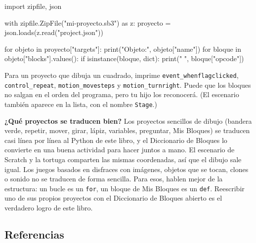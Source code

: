 \begin{code}
import zipfile, json

with zipfile.ZipFile("mi-proyecto.sb3") as z:
    proyecto = json.loads(z.read("project.json"))

for objeto in proyecto["targets"]:
    print("Objeto:", objeto["name"])
    for bloque in objeto["blocks"].values():
        if isinstance(bloque, dict):
            print("   ", bloque["opcode"])
\end{code}

Para un proyecto que dibuja un cuadrado, imprime \texttt{event\_whenflagclicked}, \texttt{control\_repeat}, \texttt{motion\_movesteps} y \texttt{motion\_turnright}. Puede que los bloques no salgan en el orden del programa, pero tu hijo los reconocerá. (El escenario también aparece en la lista, con el nombre \texttt{Stage}.)

\textbf{¿Qué proyectos se traducen bien?} Los proyectos sencillos de dibujo (bandera verde, repetir, mover, girar, lápiz, variables, preguntar, Mis Bloques) se traducen casi línea por línea al Python de este libro, y el Diccionario de Bloques lo convierte en una buena actividad para hacer juntos a mano. El escenario de Scratch y la tortuga comparten las mismas coordenadas, así que el dibujo sale igual. Los juegos basados en disfraces con imágenes, objetos que se tocan, clones o sonido no se traducen de forma sencilla. Para esos, hablen mejor de la estructura: un bucle es un \texttt{for}, un bloque de Mis Bloques es un \texttt{def}. Reescribir uno de sus propios proyectos con el Diccionario de Bloques abierto es el verdadero logro de este libro.

\subsection*{Referencias}

